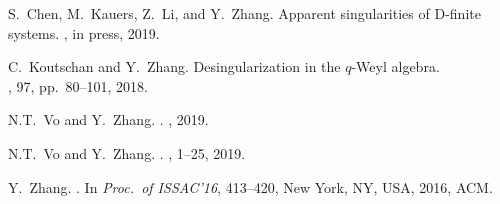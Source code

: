 \documentclass[10pt,a4paper]{article}
\begin{document}

\def\cprime{$'$}
\begin{thebibliography}{10}
S.~Chen, M.~Kauers, Z.~Li, and Y.~Zhang.
\newblock Apparent singularities of {D}-finite systems.
, in press, 2019.

C.~Koutschan and Y.~Zhang.
\newblock Desingularization in the $q$-Weyl algebra. \\
, 97, pp.\ 80–101, 2018. 

N.T.~Vo and Y.~Zhang.
.
, 2019.

N.T.~Vo and Y.~Zhang.
.
, 1--25, 2019.

Y.~Zhang.
.
\newblock In {\em Proc.\ of ISSAC'16},  413--420, New York, NY, USA, 2016, ACM.


\end{thebibliography}
%
%
\end{document}
